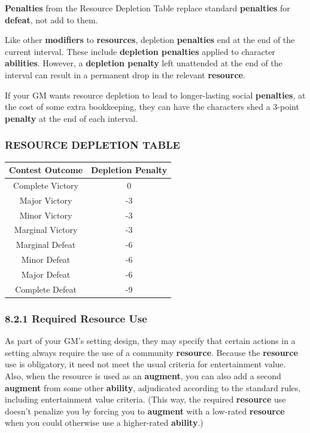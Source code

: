 \documentclass[
]{article}
\begin{document}
\textbf{Penalties} from the Resource Depletion Table replace standard
\textbf{penalties} for \textbf{defeat}, not add to them.

Like other \textbf{modifiers} to \textbf{resources}, depletion
\textbf{penalties} end at the end of the current interval. These include
\textbf{depletion penalties} applied to character \textbf{abilities}.
However, a \textbf{depletion penalty} left unattended at the end of the
interval can result in a permanent drop in the relevant
\textbf{resource}.

If your GM wants resource depletion to lead to longer-lasting social
\textbf{penalties}, at the cost of some extra bookkeeping, they can have
the characters shed a 3-point \textbf{penalty} at the end of each
interval.

\hypertarget{resource-depletion-table}{%
\subsubsection{RESOURCE DEPLETION
TABLE}\label{resource-depletion-table}}

\begin{longtable}[]{@{}cc@{}}
\toprule
Contest Outcome & Depletion Penalty\tabularnewline
\midrule
\endhead
Complete Victory & 0\tabularnewline
Major Victory & -3\tabularnewline
Minor Victory & -3\tabularnewline
Marginal Victory & -3\tabularnewline
Marginal Defeat & -6\tabularnewline
Minor Defeat & -6\tabularnewline
Major Defeat & -6\tabularnewline
Complete Defeat & -9\tabularnewline
\bottomrule
\end{longtable}

\hypertarget{required-resource-use}{%
\subsubsection{8.2.1 Required Resource
Use}\label{required-resource-use}}

As part of your GM's setting design, they may specify that certain
actions in a setting always require the use of a community
\textbf{resource}. Because the \textbf{resource} use is obligatory, it
need not meet the usual criteria for entertainment value. Also, when the
resource is used as an \textbf{augment}, you can also add a second
\textbf{augment} from some other \textbf{ability}, adjudicated according
to the standard rules, including entertainment value criteria. (This
way, the required \textbf{resource} use doesn't penalize you by forcing
you to \textbf{augment} with a low-rated \textbf{resource} when you
could otherwise use a higher-rated \textbf{ability}.)
\end{document}

